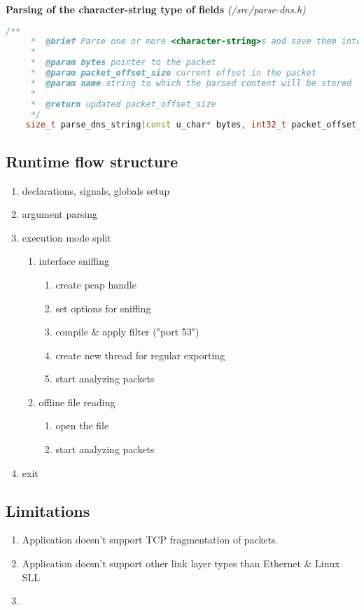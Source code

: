 \vspace{1cm}
\textbf{Parsing of the character-string type of fields} \textit{(/src/parse-dns.h)}
\begin{lstlisting}[language=C++]
    /**
     *  @brief Parse one or more <character-string>s and save them into a string
     * 
     *  @param bytes pointer to the packet
     *  @param packet_offset_size current offset in the packet
     *  @param name string to which the parsed content will be stored
     * 
     *  @return updated packet_offset_size
     */
    size_t parse_dns_string(const u_char* bytes, int32_t packet_offset_size, std::string &name);
\end{lstlisting}

\subsection{Runtime flow structure}

\begin{enumerate}
\item declarations, signals, globals setup
\item argument parsing
\item execution mode split
\begin{enumerate}[label=(\alph*)]
\item interface sniffing
\begin{enumerate}
\item create pcap handle
\item set options for sniffing
\item compile \& apply filter ("port 53")
\item create new thread for regular exporting
\item start analyzing packets
\end{enumerate}
\item offline file reading
\begin{enumerate}
\item open the file
\item start analyzing packets
\end{enumerate}
\end{enumerate}
\item exit
\end{enumerate}

\subsection{Limitations}

\begin{enumerate}
\item Application doesn't support TCP fragmentation of packets.
\item Application doesn't support other link layer types than Ethernet \& Linux SLL
\item 
\end{enumerate}